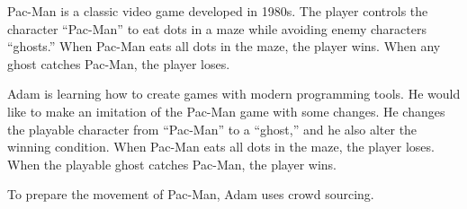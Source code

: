 Pac-Man is a classic video game developed in 1980s. 
The player controls the character ``Pac-Man'' to eat dots in a maze while
avoiding enemy characters ``ghosts.'' 
When Pac-Man eats all dots in the maze, the player wins.
When any ghost catches Pac-Man, the player loses.

Adam is learning how to create games with modern programming tools.
He would like to make an imitation of the Pac-Man game with some changes.
He changes the playable character from ``Pac-Man'' to a ``ghost,''
and he also alter the winning condition.
When Pac-Man eats all dots in the maze, the player loses.
When the playable ghost catches Pac-Man, the player wins.

To prepare the movement of Pac-Man, Adam uses crowd sourcing.


